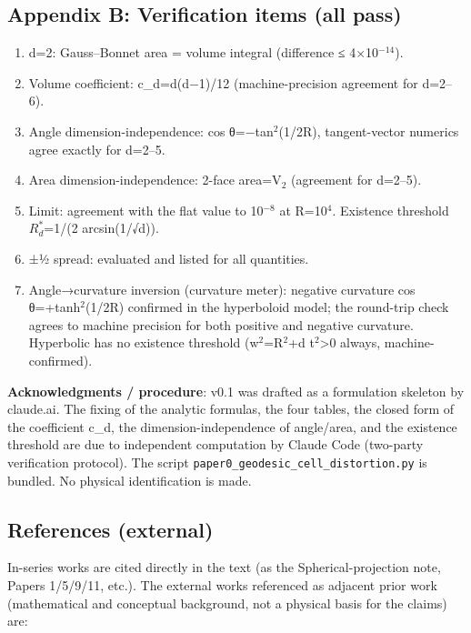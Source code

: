 \documentclass[
]{ltjsarticle}
\providecommand{\tightlist}{%
  \setlength{\itemsep}{0pt}\setlength{\parskip}{0pt}}
\begin{document}
\subsection{Appendix B: Verification items (all
pass)}\label{appendix-b-verification-items-all-pass}

\begin{enumerate}
\def\labelenumi{\arabic{enumi}.}
\tightlist
\item
  d=2: Gauss--Bonnet area = volume integral (difference ≤
  4×10\(^{-14}\)).
\item
  Volume coefficient: c\_d=d(d−1)/12 (machine-precision agreement for
  d=2--6).
\item
  Angle dimension-independence: cos θ=−tan\(^{2}\)(1/2R), tangent-vector
  numerics agree exactly for d=2--5.
\item
  Area dimension-independence: 2-face area=V\(_{2}\) (agreement for
  d=2--5).
\item
  Limit: agreement with the flat value to 10\(^{-8}\) at R=10\(^{4}\).
  Existence threshold \(R^{*}_{d}\)=1/(2 arcsin(1/√d)).
\item
  ±½ spread: evaluated and listed for all quantities.
\item
  Angle→curvature inversion (curvature meter): negative curvature cos
  θ=+tanh\(^{2}\)(1/2R) confirmed in the hyperboloid model; the
  round-trip check agrees to machine precision for both positive and
  negative curvature. Hyperbolic has no existence threshold
  (w\(^{2}\)=R\(^{2}\)+d t\(^{2}\)\textgreater0 always,
  machine-confirmed).
\end{enumerate}

\textbf{Acknowledgments / procedure}: v0.1 was drafted as a formulation
skeleton by claude.ai. The fixing of the analytic formulas, the four
tables, the closed form of the coefficient c\_d, the
dimension-independence of angle/area, and the existence threshold are
due to independent computation by Claude Code (two-party verification
protocol). The script \texttt{paper0\_geodesic\_cell\_distortion.py} is
bundled. No physical identification is made.

\subsection{References (external)}\label{references-external}

In-series works are cited directly in the text (as the
Spherical-projection note, Papers 1/5/9/11, etc.). The external works
referenced as adjacent prior work (mathematical and conceptual
background, not a physical basis for the claims) are:
\end{document}
